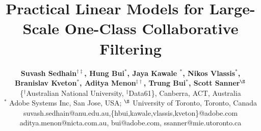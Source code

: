 \documentclass{article}
\begin{document}








\title{Practical Linear Models for Large-Scale One-Class Collaborative Filtering}


\author { \textbf{Suvash Sedhain$^{\dag\ddagger}$, Hung Bui$^{*}$, Jaya Kawale $^{*}$, Nikos Vlassis$^{*}$,} \\ \textbf{Branislav Kveton$^{*}$, Aditya Menon$^{\ddagger\dag}$, Trung Bui$^{*}$, Scott Sanner$^{\S}$}\\
\{$^{\dag}$Australian National University, $^{\ddagger}$Data61\}, Canberra, ACT, Australia\\
$^{*}$ Adobe Systems Inc, San Jose,  USA;
$^{\S}$  University of Toronto, Toronto, Canada\\
suvash.sedhain@anu.edu.au,\{hbui,kawale,vlassis,kveton\}@adobe.com\\ aditya.menon@nicta.com.au, bui@adobe.com, ssanner@mie.utoronto.ca
}%
\end{document}
